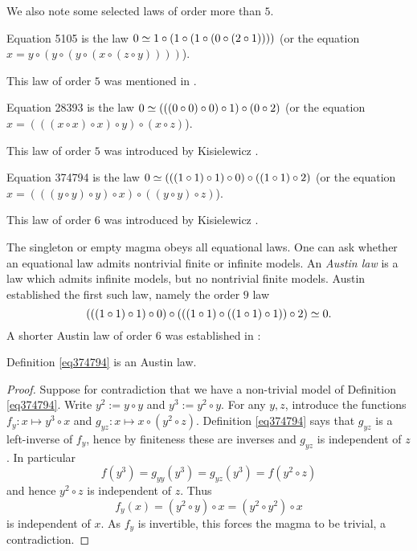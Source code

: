 \begin{definition}[Equation 953]
We also note some selected laws of order more than $5$.

\begin{definition}[Equation 5105]
  \label{eq5105}
  Equation 5105 is the law $0  \simeq 1 \circ (1 \circ (1 \circ (0 \circ (2 \circ 1))))$ (or the equation $x = y \circ (y \circ (y \circ (x \circ (z \circ y))))$).
\end{definition}

This law of order $5$ was mentioned in \cite{Kisielewicz2}.

\begin{definition}[Equation 28393]
  \label{eq28393}
  Equation 28393 is the law $0  \simeq  (((0 \circ 0) \circ 0) \circ 1) \circ (0 \circ 2)$ (or the equation $x = (((x \circ x) \circ x) \circ y) \circ (x \circ z)$).
\end{definition}

This law of order $5$ was introduced by Kisielewicz \cite{Kisielewicz}.

\begin{definition}[Equation 374794]
  \leanok
  \label{eq374794}
  Equation 374794 is the law $0  \simeq  (((1 \circ 1) \circ 1) \circ 0) \circ ((1 \circ 1) \circ 2)$ (or the equation $x = (((y \circ y) \circ y) \circ x) \circ ((y \circ y) \circ z)$).
\end{definition}

This law of order $6$ was introduced by Kisielewicz \cite{Kisielewicz}.

The singleton or empty magma obeys all equational laws.  One can ask whether an equational law admits nontrivial finite or infinite models.  An \emph{Austin law} is a law which admits infinite models, but no nontrivial finite models.  Austin \cite{austin} established the first such law, namely the order $9$ law
$$ (((1 \circ 1) \circ 1) \circ 0) \circ (((1 \circ 1) \circ ((1 \circ 1) \circ 1)) \circ 2) \simeq 0.$$
A shorter Austin law of order $6$ was established in \cite{Kisielewicz}:

\begin{theorem}
  \leanok
  \label{kis-thm}
  Definition \ref{eq374794} is an Austin law.
\end{theorem}

\begin{proof} \leanok Suppose for contradiction that we have a non-trivial model of Definition \ref{eq374794}. Write $y^2 := y \circ y$ and $y^3 := y^2 \circ y$. For any $y,z$, introduce the functions $f_y: x \mapsto y^3 \circ x$ and $g_{yz}: x \mapsto x \circ (y^2 \circ z)$.  Definition \ref{eq374794} says that $g_{yz}$ is a left-inverse of $f_y$, hence by finiteness these are inverses and $g_{yz}$ is independent of $z$. In particular
$$ f(y^3) = g_{yy}(y^3) = g_{yz}(y^3) = f(y^2 \circ z)$$
and hence $y^2 \circ z$ is independent of $z$.  Thus
$$ f_y(x) = (y^2 \circ y) \circ x = (y^2 \circ y^2) \circ x$$
is independent of $x$.  As $f_y$ is invertible, this forces the magma to be trivial, a contradiction.


\end{proof}
\end{definition}
